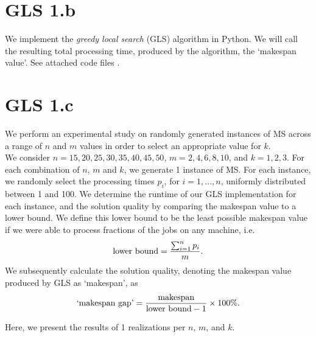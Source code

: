 \documentclass[12pt,a4paper,reqno]{article}
\begin{document}
\section*{GLS 1.b}
We implement the \textit{greedy local search} (GLS) algorithm in Python. We will call the resulting total processing time, produced by the algorithm, the `makespan value'. See attached \color{red} code files \color{black}. \\

\section*{GLS 1.c}
We perform an experimental study on randomly generated instances of MS across a range of $n$ and $m$ values in order to select an appropriate value for $k$. \\

We consider $n=15, 20, 25, 30, 35, 40, 45, 50$, $m=2,4,6,8,10$, and $k=1,2,3$. For each combination of $n$, $m$ and $k$, we generate 1 instance of MS. For each instance, we randomly select the processing times $p_i$, for $i=1,...,n$, uniformly distributed between 1 and 100. We determine the runtime of our GLS implementation for each instance, and the solution quality by comparing the makespan value to a lower bound. We define this lower bound to be the least possible makespan value if we were able to process fractions of the jobs on any machine, i.e.
\begin{equation}
\textnormal{lower bound} = \frac{\sum_{i=1}^n p_i}{m}.
\end{equation}
We subsequently calculate the solution quality, denoting the makespan value produced by GLS as `makespan', as
\begin{equation}
\textnormal{`makespan gap'} = \frac{\textnormal{makespan}}{\textnormal{lower bound} - 1} \times 100\%.
\end{equation}

Here, we present the results of 1 realizations per $n$, $m$, and $k$. \\
\end{document}
